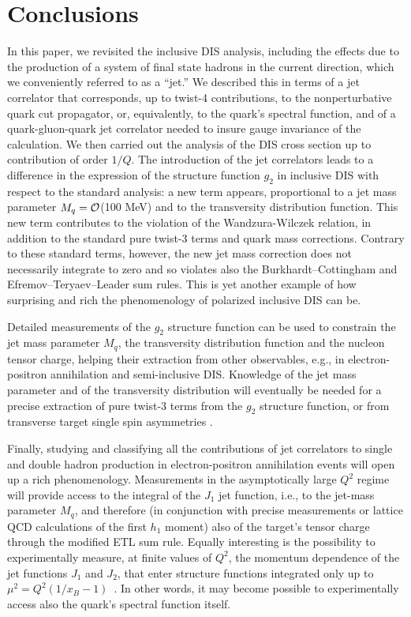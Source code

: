 \documentclass[preprintnumbers,floatfix,nofootinbib]{revtex4}
\newcommand{\mj}{M_q}
\begin{document}
\section{Conclusions}

In this paper, we revisited the inclusive DIS analysis, including the
effects due to the production of a system of final state hadrons in the current direction, which we
conveniently referred to as a ``jet.'' We described this in terms of a jet
correlator that corresponds, up to twist-4 contributions, to the nonperturbative quark cut propagator, or, equivalently, to the quark's spectral function, and of a quark-gluon-quark jet correlator needed to insure gauge invariance of the calculation.
We then carried out the analysis of
the DIS cross section up to contribution of order $1/Q$. 
The introduction of the jet correlators 
leads to a difference in the expression of the structure function $g_2$ in
inclusive DIS with respect to the standard analysis: a new term appears, proportional to a jet mass parameter $\mj={\cal O}$(100 MeV)
and to the transversity distribution function. This new term
contributes to the violation of the Wandzura-Wilczek relation, in addition to
the standard pure twist-3 terms and quark mass corrections. Contrary to these
standard terms, however, the new jet mass correction does not necessarily integrate to zero and so violates also the
Burkhardt--Cottingham and Efremov--Teryaev--Leader sum rules. This is yet another example of how surprising
and rich the phenomenology of polarized inclusive DIS can be. 

Detailed measurements of the $g_2$ structure
function can be used to constrain the jet mass parameter $M_q$, the transversity
distribution function and the nucleon tensor charge, helping their extraction from other observables, e.g., in electron-positron annihilation and semi-inclusive DIS. Knowledge of the jet mass parameter and of the transversity distribution will eventually be needed for a precise extraction of pure twist-3 terms from the $g_2$ structure function, or from transverse target single spin asymmetries \cite{Schlegel:2012ve}.

Finally, studying and classifying all the contributions of jet correlators to single and double hadron production in electron-positron annihilation events will open up a rich phenomenology. Measurements in the asymptotically large $Q^2$ regime will provide access to the integral of the $J_1$ jet function, i.e., to the jet-mass parameter $\mj$, and therefore (in conjunction with precise measurements or lattice QCD calculations of the first $h_1$ moment) also of the target's tensor charge through the modified ETL sum rule. 
Equally interesting is the possibility to experimentally measure, at finite values of $Q^2$, the momentum dependence of the jet functions $J_1$ and $J_2$, that enter structure functions integrated only up to $\mu^2=Q^2(1/x_B-1)$~\cite{Accardi:2008ne}. In other words, it may become possible to experimentally access also the quark's spectral function itself.
\end{document}
